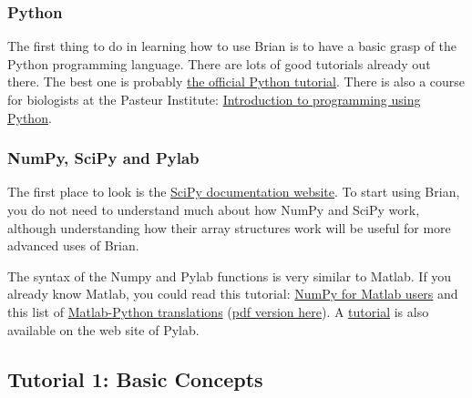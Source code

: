 \documentclass[letterpaper,10pt,english]{manual}
\begin{document}
\subsubsection{Python}

The first thing to do in learning how to use Brian
is to have a basic grasp of the Python programming language.
There are lots of good tutorials already out there. The best one is probably
\href{http://docs.python.org/tut/}{the official Python tutorial}.
There is also a course for biologists at the Pasteur Institute:
\href{http://www.pasteur.fr/formation/infobio/python/}{Introduction to programming using Python}.


\subsubsection{NumPy, SciPy and Pylab}

The first place to look is the \href{http://docs.scipy.org/doc/}{SciPy documentation website}. To start using Brian, you do not need
to understand much about how NumPy and SciPy work, although understanding how their
array structures work will be useful for more advanced uses of Brian.

The syntax of the Numpy and Pylab functions is very similar to Matlab.
If you already know Matlab, you could read this tutorial:
\href{http://scipy.org/NumPy\_for\_Matlab\_Users}{NumPy for Matlab users}
and this list of \href{http://mathesaurus.sourceforge.net/}{Matlab-Python translations}
(\href{http://brian.di.ens.fr/matlab-python-xref.pdf}{pdf version here}).
A \href{http://matplotlib.sourceforge.net/tutorial.html}{tutorial} is also available on
the web site of Pylab.

\resetcurrentobjects
\hypertarget{--doc-tutorial1_basic_concepts}{}

\hypertarget{tutorial1-basic-concepts}{}\subsection{Tutorial 1: Basic Concepts}
\end{document}

